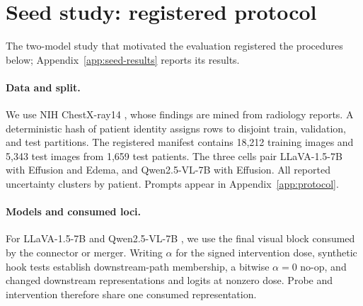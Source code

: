 \section{Seed study: registered protocol}
\label{app:seed}

The two-model study that motivated the evaluation registered the procedures below; Appendix~\ref{app:seed-results} reports its results.

\paragraph{Data and split.}
We use NIH ChestX-ray14 \citep{wang2017chestxray}, whose findings are mined from radiology reports. A deterministic hash of patient identity assigns rows to disjoint train, validation, and test partitions. The registered manifest contains 18,212 training images and 5,343 test images from 1,659 test patients. The three cells pair LLaVA-1.5-7B with Effusion and Edema, and Qwen2.5-VL-7B with Effusion. All reported uncertainty clusters by patient. Prompts appear in Appendix~\ref{app:protocol}.

\paragraph{Models and consumed loci.}
For LLaVA-1.5-7B \citep{liu2024improved} and Qwen2.5-VL-7B \citep{bai2025qwen25vl}, we use the final visual block consumed by the connector or merger. Writing $\alpha$ for the signed intervention dose, synthetic hook tests establish downstream-path membership, a bitwise $\alpha=0$ no-op, and changed downstream representations and logits at nonzero dose. Probe and intervention therefore share one consumed representation.

